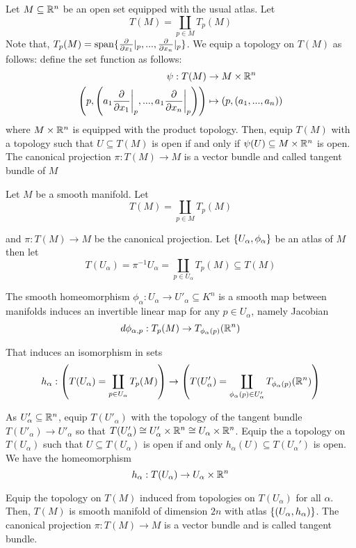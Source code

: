\begin{definition}
	Let $M \subseteq \R^n$ be an open set equipped with the usual atlas. Let
	$$
	T(M) = \coprod_{p \in M} T_p(M)    
	$$
	Note that, $T_p(M) = \Span \set{\frac{\partial}{\partial x_1}\vert_p, ..., \frac{\partial}{\partial x_n}\vert_p}$. We equip a topology on $T(M)$ as follows: define the set function as follows:
	\begin{align*}
		\psi: T(M) &\to M \times \R^n \\
		\tuple*{p, \tuple*{a_1 \frac{\partial}{\partial x_1}\bigg\vert_p, ..., a_1 \frac{\partial}{\partial x_n}\bigg\vert_p}} &\mapsto (p, (a_1, ..., a_n))
	\end{align*}
	where $M \times \R^n$ is equipped with the product topology. Then, equip $T(M)$ with a topology such that $U \subseteq T(M)$ is open if and only if $\psi(U) \subseteq M \times \R^n$ is open. The canonical projection $\pi: T(M) \to M$ is a vector bundle and called tangent bundle of $M$
	
\end{definition}

\begin{definition}
	Let $M$ be a smooth manifold. Let
	$$
	T(M) = \coprod_{p \in M} T_p(M)
	$$
	
	and $\pi: T(M) \to M$ be the canonical projection. Let $\set{U_\alpha, \phi_\alpha}$ be an atlas of $M$ then let
	$$
	T(U_\alpha) = \pi^{-1} U_\alpha = \coprod_{p \in U_\alpha} T_p(M) \subseteq T(M)
	$$
	
	The smooth homeomorphism $\phi_\alpha: U_\alpha \to U'_\alpha \subseteq K^n$ is a smooth map between manifolds induces an invertible linear map for any $p \in U_\alpha$, namely Jacobian
	$$
	d\phi_{\alpha, p}: T_p(M) \to T_{\phi_\alpha(p)} (\R^n)
	$$
	
	That induces an isomorphism in sets
	$$
	h_\alpha: \tuple*{T(U_\alpha) = \coprod_{p \in U_\alpha} T_p(M)} \to \tuple*{T(U'_\alpha) = \coprod_{\phi_\alpha(p) \in U'_\alpha} T_{\phi_\alpha(p)} (\R^n)}
	$$
	
	As $U'_\alpha \subseteq \R^n$, equip $T(U'_\alpha)$ with the topology of the tangent bundle $T(U'_\alpha) \to U'_\alpha$ so that $T(U'_\alpha) \cong U'_\alpha \times \R^n \cong U_\alpha \times \R^n$. Equip the a topology on $T(U_\alpha)$ such that $U \subseteq T(U_\alpha)$ is open if and only $h_\alpha(U) \subseteq T(U_\alpha')$ is open. We have the homeomorphism
	$$
	h_\alpha: T(U_\alpha) \to U_\alpha \times \R^n
	$$
	
	Equip the topology on $T(M)$ induced from topologies on $T(U_\alpha)$ for all $\alpha$. Then, $T(M)$ is smooth manifold of dimension $2n$ with atlas $\set{(U_\alpha, h_\alpha)}$. The canonical projection $\pi: T(M) \to M$ is a vector bundle and is called tangent bundle.
\end{definition}



